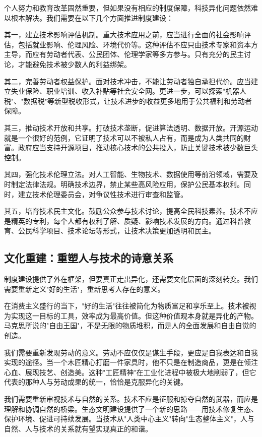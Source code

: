 \documentclass[a4paper,12pt]{ctexart}
\begin{document}
个人努力和教育改革固然重要，但如果没有相应的制度保障，科技异化问题依然难以根本解决。我们需要在以下几个方面推进制度建设：

其一，建立技术影响评估机制。重大技术应用之前，应当进行全面的社会影响评估，包括就业影响、伦理风险、环境代价等。这种评估不应只由技术专家和资本方主导，而应有劳动者代表、公民团体、伦理学家等多方参与。只有充分的民主讨论，才能避免技术被少数人的利益绑架。

其二，完善劳动者权益保护。面对技术冲击，不能让劳动者独自承担代价。应当建立失业保险、职业培训、收入补贴等社会安全网。更进一步，可以探索"机器人税"、"数据税"等新型税收形式，让技术进步的收益更多地用于公共福利和劳动者保障。

其三，推动技术开放和共享。打破技术垄断，促进算法透明、数据开放。开源运动就是一个很好的范例，它证明了技术可以不被私人占有，而是成为人类共同的财富。政府应当支持开源项目，推动核心技术的公共投入，防止关键技术被少数巨头控制。

其四，强化技术伦理立法。对人工智能、生物技术、数据使用等前沿领域，需要及时制定法律法规。明确技术边界，禁止某些高风险应用，保护公民基本权利。同时，建立技术伦理委员会，对争议性技术进行审查和监管。

其五，培育技术民主文化。鼓励公众参与技术讨论，提高全民科技素养。技术不应是精英的专利，每个人都有权利了解、质疑、影响技术发展的方向。通过科普教育、公民科学项目、技术论坛等形式，让技术决策更加透明和民主。

\subsection{文化重建：重塑人与技术的诗意关系}

制度建设提供了外在框架，但要真正走出异化，还需要文化层面的深刻转变。我们需要重新定义"好的生活"，重新思考人存在的意义。

在消费主义盛行的当下，"好的生活"往往被简化为物质富足和享乐至上。技术被视为实现这一目标的工具，效率成为最高价值。但这种价值观本身就是异化的产物。马克思所说的"自由王国"，不是无限的物质堆积，而是人的全面发展和自由自觉的创造。

我们需要重新发现劳动的意义。劳动不应仅仅是谋生手段，更应是自我表达和自我实现的途径。当一个木匠精心打磨一件家具时，他不只是在制造商品，更是在倾注心血、展现技艺、创造美。这种"工匠精神"在工业化进程中被极大地削弱了，但它代表的那种人与劳动成果的统一，恰恰是克服异化的关键。

我们需要重新审视技术与自然的关系。技术不应是征服和掠夺自然的武器，而应是理解和协调自然的桥梁。生态文明建设提供了一个新的思路——用技术修复生态、保护环境、促进可持续发展。当技术从"人类中心主义"转向"生态整体主义"，人与自然、人与技术的关系就有望实现真正的和谐。
\end{document}
